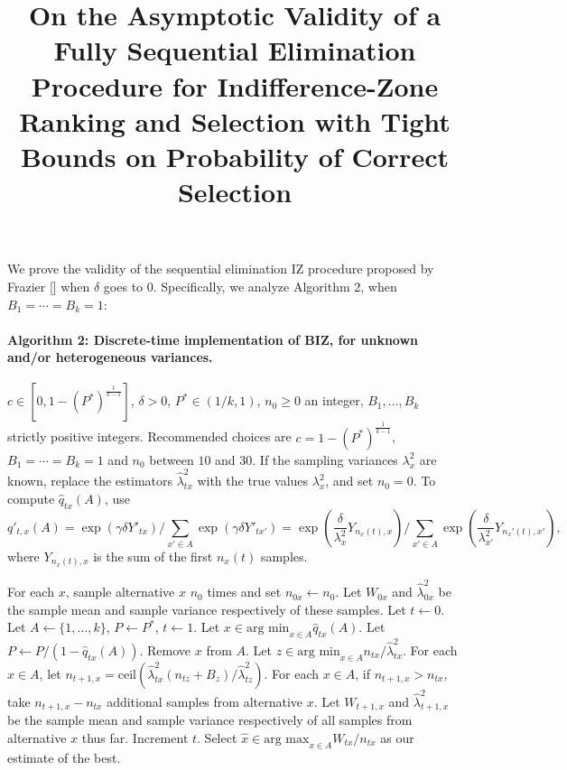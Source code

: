 \documentclass[11pt,english]{article}
\newcommand{\lambdahat}{\widehat{\lambda}}
\newcommand{\qhat}{\widehat{q}}
\newcommand{\xhat}{\hat{x}}
\newcommand{\upthresh}{P}
\newcommand{\cmax}{1-(P^*)^{\frac1{k-1}}}
\newcommand{\ceil}{\mathrm{ceil}}
\begin{document}
\title{On the Asymptotic Validity of a Fully Sequential Elimination Procedure
for Indifference-Zone Ranking and Selection with Tight Bounds on Probability
of Correct Selection}

\maketitle
We prove the validity of the sequential elimination IZ procedure proposed
by Frazier {[}{]} when $\delta$ goes to $0$. Specifically, we analyze
Algorithm 2, when $B_{1}=\cdots=B_{k}=1$:

   
\paragraph{Algorithm 2: Discrete-time implementation of BIZ, for unknown and/or heterogeneous variances.}    
\begin{algorithmic}[1]   
\label{alg:hetero-BIZ}   
\REQUIRE $c \in [0,\cmax]$, $\delta>0$, $P^*\in(1/k,1)$, $n_0\ge0$ an integer, $B_1,\ldots,B_k$ strictly positive integers.  Recommended choices are $c=\cmax$, $B_1=\cdots=B_k=1$ and $n_0$ between $10$ and $30$.     If the sampling variances $\lambda^2_x$ are known, replace the estimators     
$\lambdahat^2_{tx}$ with the true values $\lambda^2_x$, and set $n_0=0$.     
To compute $\qhat_{tx}(A)$, use \begin{equation}   q'_{t,x}(A) =    \exp\left(\gamma \delta Y'_{tx}\right) \bigg/ \sum_{x'\in A} \exp\left(\gamma \delta Y'_{tx'}\right)   = \exp\left(\frac{\delta}{\lambda^2_x} Y_{n_x(t),x}\right) \bigg/ \sum_{x'\in A} \exp\left(\frac{\delta}{\lambda^2_{x'}} Y_{n_x'(t),x'}\right), \end{equation}   
where $Y_{n_x(t),x}$ is the sum of the first $n_x(t)$ samples.
 

\STATE For each $x$, sample alternative $x$ $n_0$ times and set $n_{0x} \leftarrow n_0$.     
Let $W_{0x}$ and $\lambdahat^2_{0x}$ be the sample mean and sample variance respectively of these samples.     Let $t\leftarrow 0$.     
\STATE Let $A \leftarrow \{ 1,\ldots, k\}$, $\upthresh \leftarrow P^*$, $t \leftarrow 1$.
\WHILE{$x\in\mbox{max}_{x\in A}\qhat_{tx}(A)<P$}
\WHILE{$\mbox{min}_{x\in A} \qhat_{tx}(A) \le c$}
 \STATE Let $x\in\mbox{arg min}_{x\in A}\qhat_{tx}(A)$.
    \STATE Let $\upthresh \leftarrow \upthresh/(1-\qhat_{tx}(A))$.     
\STATE Remove $x$ from $A$.
\ENDWHILE
  \STATE Let $z \in \mbox{arg min}_{x\in A} n_{tx} / \lambdahat^2_{tx}$.     
\STATE For each $x\in A$, let      $n_{t+1,x} = \ceil\left( \lambdahat^2_{tx} (n_{tz} + B_z) / \lambdahat^2_{tz} \right)$.     \STATE For each $x\in A$, if $n_{t+1,x}>n_{tx}$, take $n_{t+1,x}-n_{tx}$ additional samples from alternative $x$.  Let $W_{t+1,x}$ and $\lambdahat^2_{t+1,x}$ be the sample mean and sample variance respectively of all samples from alternative $x$ thus far.    
\STATE Increment $t$.
 \ENDWHILE
  \STATE Select $\xhat \in\mbox{arg max}_{x\in A} W_{tx} / n_{tx}$ as our estimate of the best.

   
\end{algorithmic}   
\end{document}
